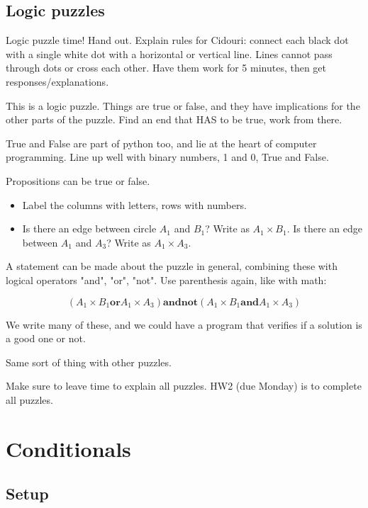 \documentclass{article}
\begin{document}
\subsection*{Logic puzzles}

Logic puzzle time!  Hand out. Explain rules for Cidouri: connect each
black dot with a single white dot with a horizontal or vertical line.
Lines cannot pass through dots or cross each other.  Have them work
for 5 minutes, then get responses/explanations.

This is a logic puzzle.  Things are true or false, and they have
implications for the other parts of the puzzle.  Find an end that HAS
to be true, work from there.

True and False are part of python too, and lie at the heart of
computer programming.  Line up well with binary numbers, 1 and 0, True
and False.

Propositions can be true or false.
\begin{itemize}
\item Label the columns with letters, rows with numbers.
\item Is there an edge between circle $A_1$ and $B_1$?  Write as $A_1
  \times B_1$. Is there an edge between $A_1$ and $A_3$? Write as $A_1
  \times A_3$.
\end{itemize}
A statement can be made about the puzzle in general, combining these
with logical operators "and", "or", "not".  Use parenthesis again, like
with math:

\newcommand{\orr}{\mathbin{\mathbf{or}}}
\newcommand{\andd}{\mathbin{\mathbf{and}}}
\newcommand{\nott}{\mathbin{\mathbf{not}}}

\[ (A_1 \times B_1 \orr A_1 \times A_3) \andd \nott (A_1 \times B_1 \andd A_1
\times A_3) \]

We write many of these, and we could have a program that verifies if a
solution is a good one or not.

Same sort of thing with other puzzles.

Make sure to leave time to explain all puzzles.  HW2 (due Monday) is
to complete all puzzles.

\newpage

\section{Conditionals}

\subsection*{Setup}
\end{document}
